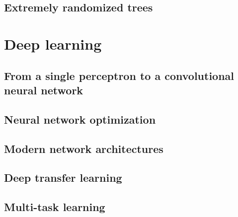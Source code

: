 \subsection{Extremely randomized trees}

\section{Deep learning}
\label{sec:backml:deeplearning}

\subsection{From a single perceptron to a convolutional neural network}

\subsection{Neural network optimization}

\subsection{Modern network architectures}

\subsection{Deep transfer learning}

\subsection{Multi-task learning}

